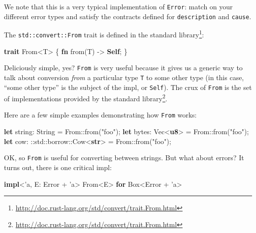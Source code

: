 \documentclass[a4paper,]{book}
\newenvironment{Shaded}{\begin{snugshade}}{\end{snugshade}}
\newcommand{\KeywordTok}[1]{\textcolor[rgb]{0.13,0.29,0.53}{\textbf{{#1}}}}
\newcommand{\StringTok}[1]{\textcolor[rgb]{0.31,0.60,0.02}{{#1}}}
\newcommand{\OtherTok}[1]{\textcolor[rgb]{0.56,0.35,0.01}{{#1}}}
\newcommand{\NormalTok}[1]{{#1}}
\renewcommand{\href}[2]{#2\footnote{\url{#1}}}
\begin{document}
We note that this is a very typical implementation of \texttt{Error}:
match on your different error types and satisfy the contracts defined
for \texttt{description} and \texttt{cause}.


The \texttt{std::convert::From} trait is
\href{http://doc.rust-lang.org/std/convert/trait.From.html}{defined in
the standard library}:


\begin{Shaded}
\begin{Highlighting}[]
\KeywordTok{trait} \NormalTok{From<T> \{}
    \KeywordTok{fn} \NormalTok{from(T) -> }\KeywordTok{Self}\NormalTok{;}
\NormalTok{\}}
\end{Highlighting}
\end{Shaded}

Deliciously simple, yes? \texttt{From} is very useful because it gives
us a generic way to talk about conversion \emph{from} a particular type
\texttt{T} to some other type (in this case, ``some other type'' is the
subject of the impl, or \texttt{Self}). The crux of \texttt{From} is the
\href{http://doc.rust-lang.org/std/convert/trait.From.html}{set of
implementations provided by the standard library}.

Here are a few simple examples demonstrating how \texttt{From} works:

\begin{Shaded}
\begin{Highlighting}[]
\KeywordTok{let} \NormalTok{string: String = From::from(}\StringTok{"foo"}\NormalTok{);}
\KeywordTok{let} \NormalTok{bytes: Vec<}\KeywordTok{u8}\NormalTok{> = From::from(}\StringTok{"foo"}\NormalTok{);}
\KeywordTok{let} \NormalTok{cow: ::std::borrow::Cow<}\KeywordTok{str}\NormalTok{> = From::from(}\StringTok{"foo"}\NormalTok{);}
\end{Highlighting}
\end{Shaded}

OK, so \texttt{From} is useful for converting between strings. But what
about errors? It turns out, there is one critical impl:

\begin{Shaded}
\begin{Highlighting}[]
\KeywordTok{impl}\NormalTok{<}\OtherTok{'a}\NormalTok{, E: Error + }\OtherTok{'a}\NormalTok{> From<E> }\KeywordTok{for} \NormalTok{Box<Error + }\OtherTok{'a}\NormalTok{>}
\end{Highlighting}
\end{Shaded}
\end{document}
